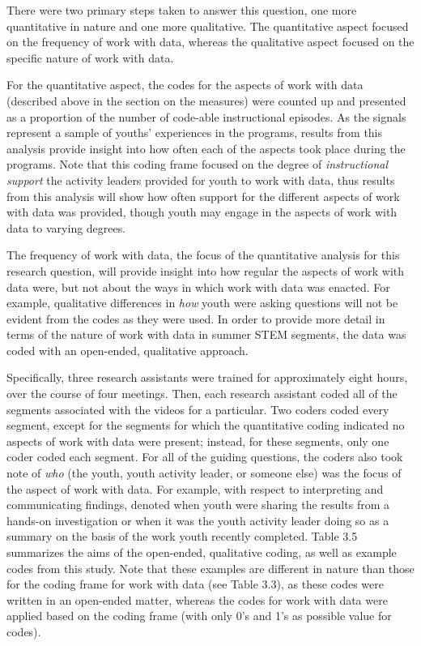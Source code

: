 \documentclass[]{msu-thesis}
\theoremstyle{definition}
\theoremstyle{definition}
\theoremstyle{definition}
\theoremstyle{remark}
\begin{document}
There were two primary steps taken to answer this question, one more
quantitative in nature and one more qualitative. The quantitative aspect
focused on the frequency of work with data, whereas the qualitative
aspect focused on the specific nature of work with data.

For the quantitative aspect, the codes for the aspects of work with data
(described above in the section on the measures) were counted up and
presented as a proportion of the number of code-able instructional
episodes. As the signals represent a sample of youths' experiences in
the programs, results from this analysis provide insight into how often
each of the aspects took place during the programs. Note that this
coding frame focused on the degree of \emph{instructional support} the
activity leaders provided for youth to work with data, thus results from
this analysis will show how often support for the different aspects of
work with data was provided, though youth may engage in the aspects of
work with data to varying degrees.

The frequency of work with data, the focus of the quantitative analysis
for this research question, will provide insight into how regular the
aspects of work with data were, but not about the ways in which work
with data was enacted. For example, qualitative differences in
\emph{how} youth were asking questions will not be evident from the
codes as they were used. In order to provide more detail in terms of the
nature of work with data in summer STEM segments, the data was coded
with an open-ended, qualitative approach.

Specifically, three research assistants were trained for approximately
eight hours, over the course of four meetings. Then, each research
assistant coded all of the segments associated with the videos for a
particular. Two coders coded every segment, except for the segments for
which the quantitative coding indicated no aspects of work with data
were present; instead, for these segments, only one coder coded each
segment. For all of the guiding questions, the coders also took note of
\emph{who} (the youth, youth activity leader, or someone else) was the
focus of the aspect of work with data. For example, with respect to
interpreting and communicating findings, denoted when youth were sharing
the results from a hands-on investigation or when it was the youth
activity leader doing so as a summary on the basis of the work youth
recently completed. Table 3.5 summarizes the aims of the open-ended,
qualitative coding, as well as example codes from this study. Note that
these examples are different in nature than those for the coding frame
for work with data (see Table 3.3), as these codes were written in an
open-ended matter, whereas the codes for work with data were applied
based on the coding frame (with only 0's and 1's as possible value for
codes).
\end{document}
